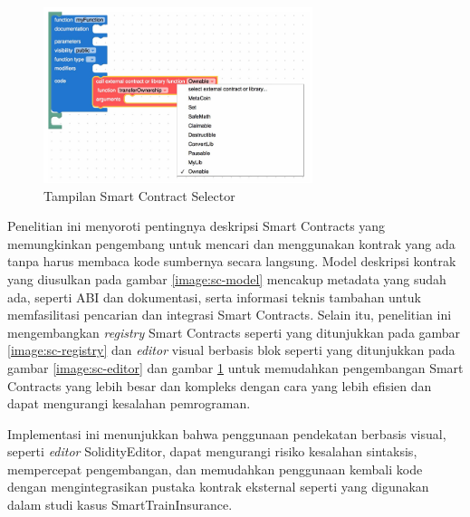 \begin{figure}[ht]
	\centering
	\includegraphics[width=0.7\textwidth]{resources/chapter-2/sc-editor-edit.png}
	\caption{Tampilan Smart Contract Selector \parencite{guida2019supporting}}
	\label{image:sc-editor-edit}
\end{figure}

\break

Penelitian ini menyoroti pentingnya deskripsi Smart Contracts yang memungkinkan pengembang untuk mencari dan menggunakan kontrak yang ada tanpa harus membaca kode sumbernya secara langsung. Model deskripsi kontrak yang diusulkan pada gambar \ref{image:sc-model} mencakup metadata yang sudah ada, seperti ABI dan dokumentasi, serta informasi teknis tambahan untuk memfasilitasi pencarian dan integrasi Smart Contracts. Selain itu, penelitian ini mengembangkan \textit{registry} Smart Contracts seperti yang ditunjukkan pada gambar \ref{image:sc-registry} dan \textit{editor} visual berbasis blok seperti yang ditunjukkan pada gambar \ref{image:sc-editor} dan gambar \ref{image:sc-editor-edit} untuk memudahkan pengembangan Smart Contracts yang lebih besar dan kompleks dengan cara yang lebih efisien dan dapat mengurangi kesalahan pemrograman.

\break

Implementasi ini menunjukkan bahwa penggunaan pendekatan berbasis visual, seperti \textit{editor} SolidityEditor, dapat mengurangi risiko kesalahan sintaksis, mempercepat pengembangan, dan memudahkan penggunaan kembali kode dengan mengintegrasikan pustaka kontrak eksternal seperti yang digunakan dalam studi kasus SmartTrainInsurance.
